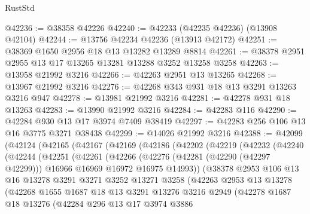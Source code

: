 \begin{lexlean}{RustStd}
\begin{coremodule}
@42236 := @38358 @42226
@42240 := @42233 (@42235 @42236) (@13908 @42104)
@42244 := @13756 @42234 @42236 (@13913 @42172)
@42251 := @38369 @1650 @2956 @18 @13 @13282 @13289 @8814
@42261 := @38378 @2951 @2955 @13 @17 @13265 @13281 @13288 @3252 @13258 @3258
@42263 := @13958 @21992 @3216
@42266 := @42263 @2951 @13 @13265
@42268 := @13967 @21992 @3216
@42276 := @42268 @343 @931 @18 @13 @3291 @13263 @3216 @947
@42278 := @13981 @21992 @3216
@42281 := @42278 @931 @18 @13263
@42283 := @13990 @21992 @3216
@42284 := @42283 @116
@42290 := @42284 @930 @13 @17 @3974 @7409 @38419
@42297 := @42283 @256 @106 @13 @16 @3775 @3271 @38438
@42299 := @14026 @21992 @3216
@42388 := @42099
    (@42124
      (@42165
        (@42167
          (@42169
            (@42186
              (@42202
                (@42219
                  (@42232
                    (@42240
                      (@42244
                        (@42251
                          (@42261
                            (@42266
                              (@42276
                                (@42281 (@42290 (@42297 @42299)))
                                @16966
                                @16969
                                @16972
                                @16975
                                @14993))
                            (@38378
                              @2953
                              @106
                              @13
                              @16
                              @13278
                              @3291
                              @3271
                              @3252
                              @13271
                              @3258
                              (@42263
                                @2953
                                @13
                                @13278
                                (@42268
                                  @1655
                                  @1687
                                  @18
                                  @13
                                  @3291
                                  @13276
                                  @3216
                                  @2949
                                  (@42278
                                    @1687
                                    @18
                                    @13276
                                    (@42284
                                      @296
                                      @13
                                      @17
                                      @3974
                                      @3886

\end{coremodule}
\end{lexlean}
